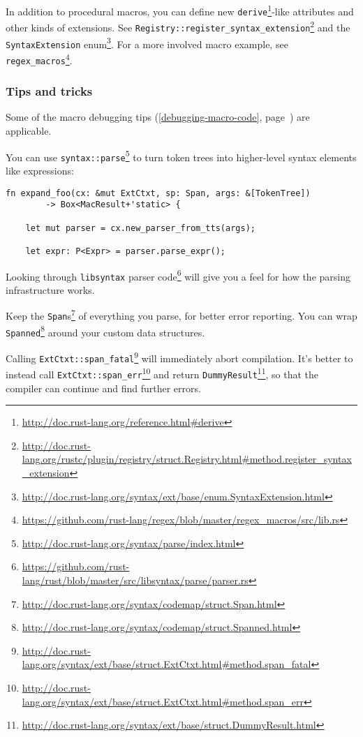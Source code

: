 \documentclass[a4paper,]{book}
\renewcommand*{\hyperref}[2][\ar]{%
  \def\ar{#2}%
  #2 (\autoref{#1}, page~\pageref{#1})}
\renewcommand{\href}[2]{#2\footnote{\url{#1}}}
\begin{document}
In addition to procedural macros, you can define new
\href{http://doc.rust-lang.org/reference.html\#derive}{\texttt{derive}}-like
attributes and other kinds of extensions. See
\href{http://doc.rust-lang.org/rustc/plugin/registry/struct.Registry.html\#method.register_syntax_extension}{\texttt{Registry::register\_syntax\_extension}}
and the
\href{http://doc.rust-lang.org/syntax/ext/base/enum.SyntaxExtension.html}{\texttt{SyntaxExtension}
enum}. For a more involved macro example, see
\href{https://github.com/rust-lang/regex/blob/master/regex_macros/src/lib.rs}{\texttt{regex\_macros}}.

\subsubsection{Tips and tricks}\label{tips-and-tricks}

Some of the \hyperref[debugging-macro-code]{macro debugging tips} are
applicable.

You can use
\href{http://doc.rust-lang.org/syntax/parse/index.html}{\texttt{syntax::parse}}
to turn token trees into higher-level syntax elements like expressions:

\begin{verbatim}
fn expand_foo(cx: &mut ExtCtxt, sp: Span, args: &[TokenTree])
        -> Box<MacResult+'static> {

    let mut parser = cx.new_parser_from_tts(args);

    let expr: P<Expr> = parser.parse_expr();
\end{verbatim}

Looking through
\href{https://github.com/rust-lang/rust/blob/master/src/libsyntax/parse/parser.rs}{\texttt{libsyntax}
parser code} will give you a feel for how the parsing infrastructure
works.

Keep the
\href{http://doc.rust-lang.org/syntax/codemap/struct.Span.html}{\texttt{Span}s}
of everything you parse, for better error reporting. You can wrap
\href{http://doc.rust-lang.org/syntax/codemap/struct.Spanned.html}{\texttt{Spanned}}
around your custom data structures.

Calling
\href{http://doc.rust-lang.org/syntax/ext/base/struct.ExtCtxt.html\#method.span_fatal}{\texttt{ExtCtxt::span\_fatal}}
will immediately abort compilation. It's better to instead call
\href{http://doc.rust-lang.org/syntax/ext/base/struct.ExtCtxt.html\#method.span_err}{\texttt{ExtCtxt::span\_err}}
and return
\href{http://doc.rust-lang.org/syntax/ext/base/struct.DummyResult.html}{\texttt{DummyResult}},
so that the compiler can continue and find further errors.
\end{document}
